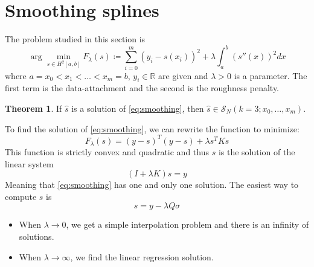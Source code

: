 \documentclass[12pt, openany]{report}
\newcommand{\R}{\mathbb{R}}
\theoremstyle{definition}
\newtheorem{thm}{Theorem}[chapter]
\begin{document}
\section{Smoothing splines}
The problem studied in this section is 
\begin{equation}\label{eq:smoothing}
    \arg\min_{s\in H^2[a,b]}F_{\lambda}(s) \coloneqq \sum_{i=0}^m (y_i-s(x_i))^2 + \lambda \int_a^b (s''(x))^2dx
\end{equation}
where $a=x_0<x_1<\dots<x_m=b$, $y_i\in \R$ are given and $\lambda >0$ is a parameter. The first term is the data-attachment and the second is the roughness penalty.
\begin{thm}
    If $\hat s$ is a solution of \eqref{eq:smoothing}, then $\hat s\in \mathcal{S}_N(k=3;x_0,\dots,x_m)$.
\end{thm}
To find the solution of \eqref{eq:smoothing}, we can rewrite the function to minimize:
\begin{equation}
    F_{\lambda}(s) = (y-s)^T(y-s)+\lambda s^TKs
\end{equation}
This function is strictly convex and quadratic and thus $s$ is the solution of the linear system 
\begin{equation}
    (I+\lambda K)s=y
\end{equation}
Meaning that \eqref{eq:smoothing} has one and only one solution. The easiest way to compute $s$ is 
\begin{equation}
    s = y-\lambda Q\sigma
\end{equation}
\begin{itemize}
    \item When $\lambda \rightarrow 0$, we get a simple interpolation problem and there is an infinity of solutions.
    \item When $\lambda \rightarrow \infty$, we find the linear regression solution.
\end{itemize}
\end{document}
